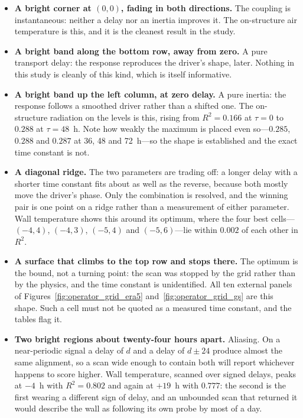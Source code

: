 \documentclass[11pt,a4paper]{article}
\begin{document}
\begin{itemize}
\item \textbf{A bright corner at $(0,0)$, fading in both directions.} The
coupling is instantaneous: neither a delay nor an inertia improves it. The
on-structure air temperature is this, and it is the cleanest result in the
study.

\item \textbf{A bright band along the bottom row, away from zero.} A pure
transport delay: the response reproduces the driver's shape, later. Nothing in
this study is cleanly of this kind, which is itself informative.

\item \textbf{A bright band up the left column, at zero delay.} A pure
inertia: the response follows a smoothed driver rather than a shifted one. The
on-structure radiation on the levels is this, rising from $R^2 = 0.166$ at
$\tau = 0$ to $0.288$ at $\tau = 48$~h. Note how weakly the maximum is placed
even so---$0.285$, $0.288$ and $0.287$ at 36, 48 and 72~h---so the shape is
established and the exact time constant is not.

\item \textbf{A diagonal ridge.} The two parameters are trading off: a longer
delay with a shorter time constant fits about as well as the reverse, because
both mostly move the driver's phase. Only the combination is resolved, and the
winning pair is one point on a ridge rather than a measurement of either
parameter. Wall temperature shows this around its optimum, where the four best
cells---$(-4, 4)$, $(-4, 3)$, $(-5, 4)$ and $(-5, 6)$---lie within $0.002$ of
each other in $R^2$.

\item \textbf{A surface that climbs to the top row and stops there.} The
optimum is the bound, not a turning point: the scan was stopped by the grid
rather than by the physics, and the time constant is unidentified. All ten
external panels of Figures~\ref{fig:operator_grid_era5}
and~\ref{fig:operator_grid_gs} are this shape. Such a cell must not be quoted
as a measured time constant, and the tables flag it.

\item \textbf{Two bright regions about twenty-four hours apart.} Aliasing. On
a near-periodic signal a delay of $d$ and a delay of $d \pm 24$ produce almost
the same alignment, so a scan wide enough to contain both will report whichever
happens to score higher. Wall temperature, scanned over signed delays, peaks at
$-4$~h with $R^2 = 0.802$ and again at $+19$~h with $0.777$: the second is the
first wearing a different sign of delay, and an unbounded scan that returned it
would describe the wall as following its own probe by most of a day.


\end{itemize}
\end{document}
